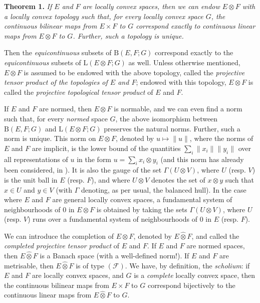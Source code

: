 \documentclass[british]{article}
\newenvironment{itenv}[1]
  {\phantomsection\par\smallskip\noindent\textbf{#1.}\itshape}
  {\par\smallskip}
\newcommand{\oldpage}[1]{\marginpar{\footnotesize$\Big\vert$ \textit{p.~#1}}}
\begin{document}
\protect{}\label{section-1-theorem-1}
\begin{itenv}{Theorem 1}
If \(E\) and \(F\) are locally convex spaces, then we can endow
\(E\otimes F\) with a locally convex topology such that, for every
locally convex space \(G\), the \emph{continuous} bilinear maps from
\(E\times F\) to \(G\) correspond exactly to \emph{continuous} linear
maps from \(E\otimes F\) to \(G\). Further, such a topology is unique.

\end{itenv}

Then the \emph{equicontinuous} subsets of \(\mathrm{B}(E,F;G)\)
correspond exactly to the \emph{equicontinuous} subsets of
\(\mathrm{L}(E\otimes F;G)\) as well. Unless otherwise mentioned,
\(E\otimes F\) is assumed to be endowed with the above topology, called
the \emph{projective tensor product of the topologies of \(E\) and
\(F\)}; endowed with this topology, \(E\otimes F\) is called the
\emph{projective topological tensor product} of \(E\) and \(F\).

If \(E\) and \(F\) are normed, then \(E\otimes F\) is normable, and we
can even find a norm such that, for every \emph{normed} space \(G\), the
above isomorphism between \(\mathrm{B}(E,F;G)\) and
\(\mathrm{L}(E\otimes F;G)\) preserves the natural norms. Further, such
a norm is unique. This norm on \(E\otimes F\), denoted by
\(u\mapsto\|u\|\), where the norms of \(E\) and \(F\) are implicit, is
the lower bound of the quantities \(\sum_i\|x_i\|\|y_i\|\) over all
representations of \(u\) in the form \(u=\sum_i x_i\otimes y_i\) (and
this norm has already been considered, in \autocite{8}). It is also the
gauge of the set \(\Gamma(U\otimes V)\), where \(U\) (resp. \(V\)) is
the unit ball in \(E\) (resp. \(F\)), and where \(U\otimes V\) denotes
the set of \(x\otimes y\) such that \(x\in U\) and \(y\in V\) (with
\(\Gamma\) denoting, as per usual, the balanced hull). \oldpage{77} In
the case where \(E\) and \(F\) are general locally convex spaces, a
fundamental system of neighbourhoods of \(0\) in \(E\otimes F\) is
obtained by taking the sets \(\Gamma(U\otimes V)\), where \(U\) (resp.
\(V\)) runs over a fundamental system of neighbourhoods of \(0\) in
\(E\) (resp. \(F\)).

We can introduce the completion of \(E\otimes F\), denoted by
\(E\hat{\otimes}F\), and called the \emph{completed projective tensor
product} of \(E\) and \(F\). If \(E\) and \(F\) are normed spaces, then
\(E\hat{\otimes}F\) is a Banach space (with a well-defined norm!). If
\(E\) and \(F\) are metrisable, then \(E\hat{\otimes}F\) is of type
\((\mathscr{F})\). We have, by definition, the \emph{scholium}: if \(E\)
and \(F\) are locally convex spaces, and \(G\) is a \emph{complete}
locally convex space, then the continuous bilinear maps from
\(E\times F\) to \(G\) correspond bijectively to the continuous linear
maps from \(E\hat{\otimes}F\) to \(G\).
\end{document}
